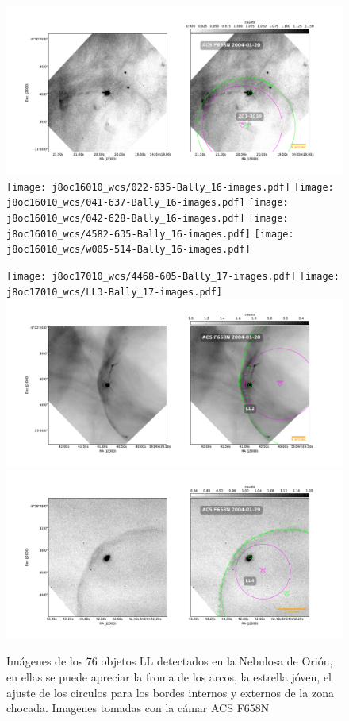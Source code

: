 \documentclass{article}
\begin{document}
\begin{figure}
  \centering
    \includegraphics[width=0.5\linewidth]{j8oc14010_wcs/203-3039-Bally_14-images.pdf}
    \texttt{[image: j8oc16010\_wcs/022-635-Bally\_16-images.pdf]}
    \texttt{[image: j8oc16010\_wcs/041-637-Bally\_16-images.pdf]} 
    \texttt{[image: j8oc16010\_wcs/042-628-Bally\_16-images.pdf]}
    \texttt{[image: j8oc16010\_wcs/4582-635-Bally\_16-images.pdf]}
    \texttt{[image: j8oc16010\_wcs/w005-514-Bally\_16-images.pdf]}
\label{fig:images}
\end{figure}

\begin{figure}
  \centering
    \texttt{[image: j8oc17010\_wcs/4468-605-Bally\_17-images.pdf]}
    \texttt{[image: j8oc17010\_wcs/LL3-Bally\_17-images.pdf]}
    \includegraphics[width=0.5\linewidth]{j8oc18010_wcs/LL2-Bally_18-images.pdf}
    \includegraphics[width=0.5\linewidth]{j8oc24010_wcs/LL4-Bally_24-images.pdf}
  \caption{Imágenes de los 76 objetos LL detectados en la Nebulosa de Orión, en ellas se puede apreciar la froma de los arcos, la estrella jóven, el ajuste de los circulos para los bordes internos y externos de la zona chocada. Imagenes tomadas con la cámar ACS F658N}
  \label{fig:images}

\end{figure}
\end{document}
